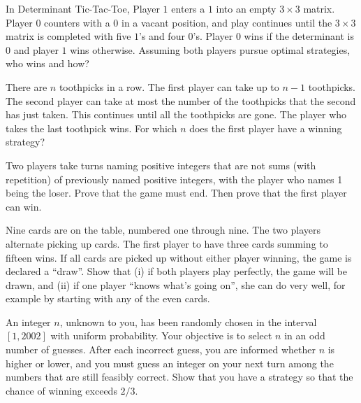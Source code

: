\documentclass{article}
\begin{document}
\begin{exercise}
In Determinant Tic-Tac-Toe, Player $1$ enters a $1$ into an empty $3\times 3$ matrix. Player $0$ counters with a $0$ in a vacant position, and play continues until the $3\times 3$ matrix is completed with five $1$'s and four $0$'s. Player $0$ wins if the determinant is $0$ and player $1$ wins otherwise. Assuming both players pursue optimal strategies, who wins and how?
\end{exercise}

\begin{exercise}
There are $n$ toothpicks in a row. The first player can take up to $n-1$ toothpicks. The second player can take at most the number of the toothpicks that the second has just taken. This continues until all the toothpicks are gone. The player who takes the last toothpick wins. For which $n$ does the first player have a winning strategy?
\end{exercise}

\begin{exercise}
Two players take turns naming positive integers that are not sums (with repetition) of previously named positive integers, with the player who names 1 being the loser. Prove that the game must end. Then prove that the first player can win.
\end{exercise}

\begin{exercise}
    Nine cards are on the table, numbered one through nine. The two players alternate picking up cards. The first player to have three cards summing to fifteen wins. If all cards are picked up without either player winning, the game is declared a ``draw''. Show that (i) if both players play perfectly, the game will be drawn, and (ii) if one player ``knows what's going on'', she can do very well, for example by starting with any of the even cards.
\end{exercise}

\begin{exercise}
An integer $n$, unknown to you, has been randomly chosen in the interval $[1,2002]$ with uniform probability. Your objective is to select $n$ in an odd number of guesses. After each incorrect guess, you are informed whether $n$ is higher or lower, and you must guess an integer on your next turn among the numbers that are still feasibly correct. Show that you have a strategy so that the chance of winning exceeds $2/3$.
\end{exercise}
\end{document}
